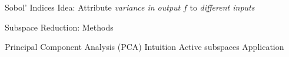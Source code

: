 \documentclass[14pt]{beamer}
\begin{document}
\begin{frame}{Sobol' Indices}
  Idea: Attribute \emph{variance in output} $f$ to \emph{different inputs}
\end{frame}

\begin{frame}{Subspace Reduction: Methods}
  \begin{outline}
    \1 Principal Component Analysis (PCA)
      \2 Intuition
    \1 Active subspaces
      \2 Application
  \end{outline}
\end{frame}
\end{document}
